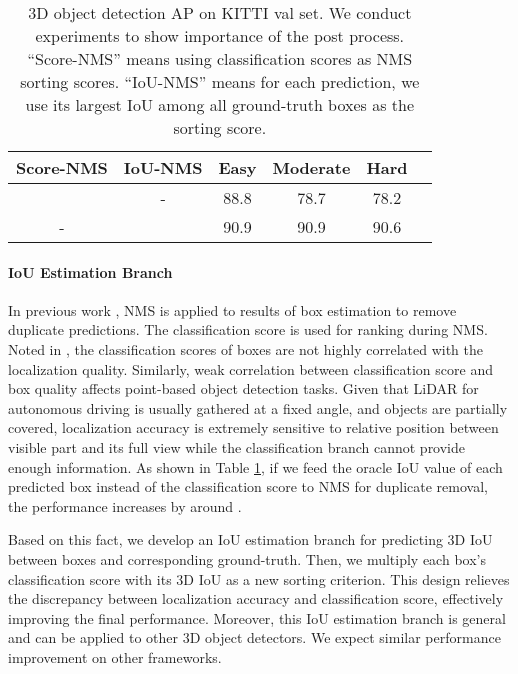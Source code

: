 \documentclass[10pt,twocolumn,letterpaper]{article}
\begin{document}
\begin{table}[t]
   \centering \addtolength{\tabcolsep}{-1pt}
   \footnotesize
   \begin{tabular}{|c|c|c|c|c|c|}
       \hline
       Score-NMS & IoU-NMS & Easy & Moderate & Hard \\
       \hline
        & - & 88.8 & 78.7 & 78.2 \\
       - &  & 90.9 & 90.9 & 90.6 \\
      \hline
   \end{tabular}\vspace{0.3cm}
   \caption{3D object detection AP on KITTI val set. We conduct experiments to show importance of the post process. ``Score-NMS'' means using classification scores as NMS sorting scores. ``IoU-NMS'' means for each prediction, we use its largest IoU among all ground-truth boxes as the sorting score. }
   \label{tab:whether_nms_iou_nearest}
\end{table}

\vspace{-0.1in}
\paragraph{IoU Estimation Branch}
\label{IoU_estimation_framework}
In previous work \cite{lang2018pointpillars,yan2018second,VOXELNET,AVOD,shi2018pointrcnn}, NMS is applied to results of box estimation to remove duplicate predictions. The classification score is used for ranking during NMS. Noted in \cite{jiang2018acquisition,liu2015box,qi2018sequential}, the classification scores of boxes are not highly correlated with the localization quality. Similarly, weak correlation between classification score and box quality affects point-based object detection tasks. Given that LiDAR for autonomous driving is usually gathered at a fixed angle, and objects are partially covered, localization accuracy is extremely sensitive to relative position between visible part and its full view while the classification branch cannot provide enough information. 
As shown in Table \ref{tab:whether_nms_iou_nearest}, if we feed the oracle IoU value of each predicted box instead of the classification score to NMS for duplicate removal, the performance increases by around .

Based on this fact, we develop an IoU estimation branch for predicting 3D IoU between boxes and corresponding ground-truth. Then, we multiply each box's classification score with its 3D IoU as a new sorting criterion. This design relieves the discrepancy between localization accuracy and classification score, effectively improving the final performance. Moreover, this IoU estimation branch is general and can be applied to other 3D object detectors. We expect similar performance improvement on other frameworks.
\end{document}
